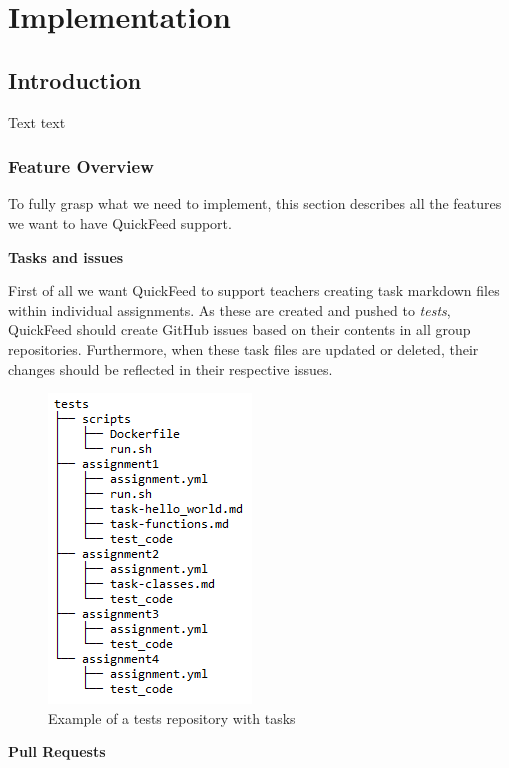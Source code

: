 
\chapter{Implementation}
\label{ch:implementation}

\section{Introduction}

Text text

\subsection{Feature Overview}

To fully grasp what we need to implement, this section describes all the features we want to have QuickFeed support.

\textbf{Tasks and issues}

First of all we want QuickFeed to support teachers creating task markdown files within individual assignments.
As these are created and pushed to \textit{tests}, QuickFeed should create GitHub issues based on their contents in all group repositories.
Furthermore, when these task files are updated or deleted, their changes should be reflected in their respective issues.

\begin{figure}[ht]
    \centering
    \includegraphics[scale=0.8]{photos/tests-repository-structure-tasks.PNG}
    \caption{Example of a tests repository with tasks}
    \label{fig:tests-repository-structure-tasks}
\end{figure}

\textbf{Pull Requests}

